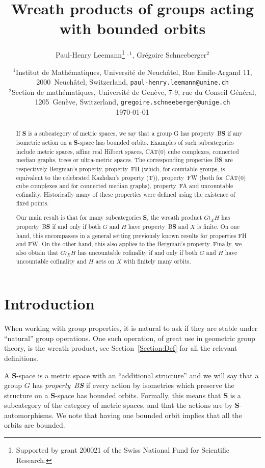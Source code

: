 \documentclass[a4paper]{article}
\title{Wreath products of groups acting with bounded orbits}
\author{Paul-Henry Leemann\thanks{Supported by grant 200021\textunderscore188578 of the Swiss National Fund for Scientific Research.} $^{,1}$, Grégoire Schneeberger$^2$}
\date{%
{\small $^1$Institut de Math\'ematiques, Universit\'e de Neuch\^atel, Rue Emile-Argand 11, 2000~Neuch\^atel, Switzerland, \texttt{paul-henry.leemann@unine.ch}}\\%
{\small $^2$Section de math\'ematiques, Universit\'e de Gen\`eve, 7-9, rue du Conseil G\'en\'eral, 1205~Gen\`eve, Switzerland, \texttt{gregoire.schneeberger@unige.ch}}\\[2ex]%
\today}
\theoremstyle{definition}
\newcommand*{\category}[1]{\textbf{#1}}
\newcommand*{\CatS}{\category{S}}
\newcommand*{\BS}{B\textbf{S}}
\newcommand*{\FH}{FH}
\newcommand*{\FW}{FW}
\newcommand*{\FA}{FA}
\begin{document}
\maketitle
%
%
%
%
%
%
%
%
%
%
\begin{abstract}
If \CatS{} is a subcategory of metric spaces, we say that a group G has property~\BS{} if any isometric action on a \CatS-space has bounded orbits.
Examples of such subcategories include metric spaces, affine real Hilbert spaces, CAT(0) cube complexes, connected median graphs, trees or ultra-metric spaces. 
The corresponding properties \BS{} are respectively Bergman's property, property~\FH{}  (which, for countable groups, is equivalent to the celebrated Kazhdan's property (T)), property~\FW{} (both for CAT(0) cube complexes and for connected median graphs), property~\FA{} and uncountable cofinality.
Historically many of these properties were defined using the existence of fixed points.

Our main result is that for many subcategories \CatS, the wreath product $G\wr_XH$ has property~\BS{} if and only if both $G$ and $H$ have property~\BS{} and $X$ is finite.
On one hand, this encompasses in a general setting previously known results for properties \FH{} and \FW.
On the other hand, this also applies to the Bergman's property.
Finally, we also obtain that $G\wr_XH$ has uncountable cofinality if and only if both $G$ and $H$ have uncountable cofinality and $H$ acts on $X$ with finitely many orbits.
\end{abstract}
%
%
%
%
%
%
%
%
%
%
%
%
%
%
%
%
%
%
%
%
%
%
%
%
%
\section{Introduction}
%
%
%
%
%
%
When working with group properties, it is natural to ask if they are stable under ``natural'' group operations.
One such operation, of great use in geometric group theory, is the wreath product, see Section~\ref{Section:Def} for all the relevant definitions.

A \CatS-space is a metric space with an ``additional structure'' and we will say that a group $G$ has \emph{property~\BS} if every action by isometries which preserve the structure on a \CatS-space has bounded orbits.
Formally, this means that \CatS{} is a subcategory of the category of metric spaces, and that the actions are by \CatS-automorphisms.
We note that having one bounded orbit implies that all the orbits are bounded.
\end{document}
